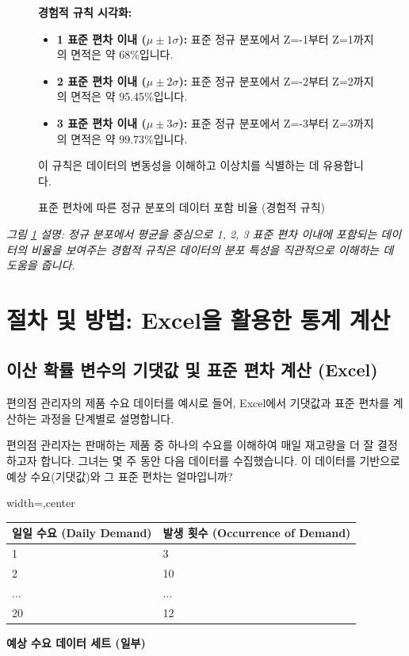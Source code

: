 \documentclass[11pt,a4paper]{book}
\providecommand{\captionof}[2]{\textbf{#2}}
\theoremstyle{definition}
\begin{document}
\begin{figure}[h!]
    \centering
    \begin{tcolorbox}[colback=white, colframe=black, title={\textbf{표준 편차에 따른 정규 분포의 데이터 포함 비율}}]
    \textbf{경험적 규칙 시각화:}
    \begin{itemize}
        \item \textbf{1 표준 편차 이내 ($\mu \pm 1\sigma$):} 표준 정규 분포에서 Z=-1부터 Z=1까지의 면적은 약 68\%입니다.
        \item \textbf{2 표준 편차 이내 ($\mu \pm 2\sigma$):} 표준 정규 분포에서 Z=-2부터 Z=2까지의 면적은 약 95.45\%입니다.
        \item \textbf{3 표준 편차 이내 ($\mu \pm 3\sigma$):} 표준 정규 분포에서 Z=-3부터 Z=3까지의 면적은 약 99.73\%입니다.
    \end{itemize}
    이 규칙은 데이터의 변동성을 이해하고 이상치를 식별하는 데 유용합니다.
    \end{tcolorbox}
    \caption{표준 편차에 따른 정규 분포의 데이터 포함 비율 (경험적 규칙)}
    \label{fig:empirical_rule}
\end{figure}
\textit{그림 \ref{fig:empirical_rule} 설명: 정규 분포에서 평균을 중심으로 1, 2, 3 표준 편차 이내에 포함되는 데이터의 비율을 보여주는 경험적 규칙은 데이터의 분포 특성을 직관적으로 이해하는 데 도움을 줍니다.}


\section{절차 및 방법: Excel을 활용한 통계 계산}

\subsection{이산 확률 변수의 기댓값 및 표준 편차 계산 (Excel)}
편의점 관리자의 제품 수요 데이터를 예시로 들어, Excel에서 기댓값과 표준 편차를 계산하는 과정을 단계별로 설명합니다.

\begin{examplebox}[title={문제 상황}]
편의점 관리자는 판매하는 제품 중 하나의 수요를 이해하여 매일 재고량을 더 잘 결정하고자 합니다. 그녀는 몇 주 동안 다음 데이터를 수집했습니다. 이 데이터를 기반으로 예상 수요(기댓값)와 그 표준 편차는 얼마입니까?
\end{examplebox}

\begin{adjustbox}{width=\textwidth,center}
\begin{tabular}{ll}
\toprule
\textbf{일일 수요 (Daily Demand)} & \textbf{발생 횟수 (Occurrence of Demand)} \\
\midrule
1 & 3 \\
2 & 10 \\
... & ... \\
20 & 12 \\
\bottomrule
\end{tabular}
\end{adjustbox}
\captionof{table}{예상 수요 데이터 세트 (일부)}
\label{tab:demand_data}
\end{document}

